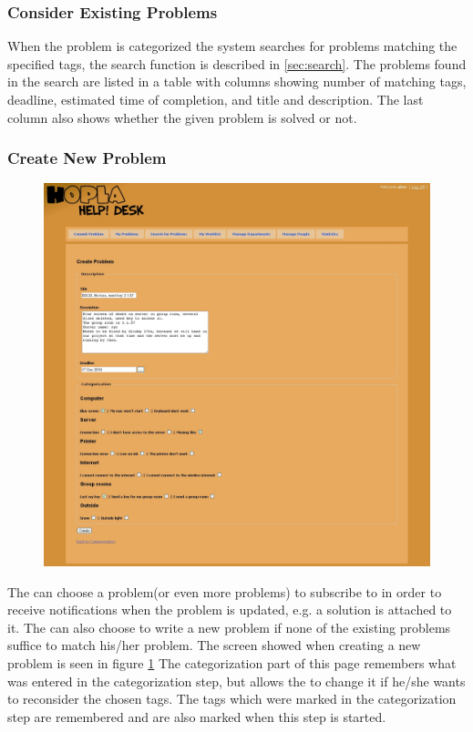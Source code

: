 \subsubsection{Consider Existing Problems}
\label{ssu:consider}
When the problem is categorized the system searches for problems matching the specified tags, the search function is described in \ref{sec:search}.
The problems found in the search are listed in a table with columns showing number of matching tags, deadline, estimated time of completion, and title and description.
The last column also shows whether the given problem is solved or not.

\subsubsection{Create New Problem}
\begin{figure}[htb]
	\centering
		\includegraphics[width=1.00\textwidth, clip=true, trim=2.9cm 0.5cm 15cm 8cm]{input/implementation/program_presentation/newProblem.png}
	\label{fig:newProblem}
\end{figure}
The \aclient[] can choose a problem(or even more problems) to subscribe to in order to receive notifications when the problem is updated, e.g. a solution is attached to it.
The \aclient[] can also choose to write a new problem if none of the existing problems suffice to match his/her problem.
The screen showed when creating a new problem is seen in figure \ref{fig:newProblem}
The categorization part of this page remembers what was entered in the categorization step, but allows the \aclient[] to change it if he/she wants to reconsider the chosen tags.
The tags which were marked in the categorization step are remembered and are also marked when this step is started.

